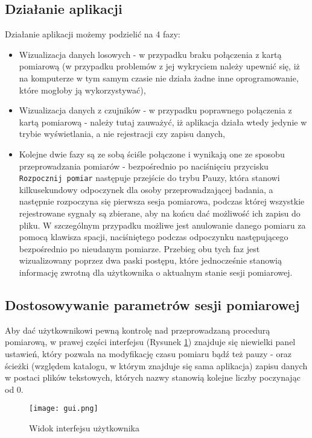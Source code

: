 \documentclass[10pt, a4paper]{article}
\begin{document}
\subsection{Działanie aplikacji}
Działanie aplikacji możemy podzielić na 4 fazy:
\begin{itemize}
\item Wizualizacja danych losowych - w przypadku braku połączenia z kartą pomiarową (w przypadku problemów z jej wykryciem należy upewnić się, iż na komputerze w tym samym czasie nie działa żadne inne oprogramowanie, które mogłoby ją wykorzystywać),
\item Wizualizacja danych z czujników - w przypadku poprawnego połączenia z kartą pomiarową - należy tutaj zauważyć, iż aplikacja działa wtedy jedynie w trybie wyświetlania, a nie rejestracji czy zapisu danych,
\item Kolejne dwie fazy są ze sobą ściśle połączone i wynikają one ze sposobu przeprowadzania pomiarów - bezpośrednio po naciśnięciu przycisku \texttt{Rozpocznij pomiar} następuje przejście do trybu Pauzy, która stanowi kilkusekundowy odpoczynek dla osoby przeprowadzającej badania, a następnie rozpoczyna się pierwsza sesja pomiarowa, podczas której wszystkie rejestrowane sygnały są zbierane, aby na końcu dać możliwość ich zapisu do pliku. W szczególnym przypadku możliwe jest anulowanie danego pomiaru za pomocą klawisza spacji, naciśniętego podczas odpoczynku następującego bezpośrednio po nieudanym pomiarze. Przebieg obu tych faz jest wizualizowany poprzez dwa paski postępu, które jednocześnie stanowią informację zwrotną dla użytkownika o aktualnym stanie sesji pomiarowej.
\end{itemize}

\subsection{Dostosowywanie parametrów sesji pomiarowej}

Aby dać użytkownikowi pewną kontrolę nad przeprowadzaną procedurą pomiarową, w prawej części interfejsu (Rysunek \ref{gui}) znajduje się niewielki panel ustawień, który pozwala na modyfikację czasu pomiaru bądź też pauzy - oraz ścieżki (względem katalogu, w którym znajduje się sama aplikacja) zapisu danych w postaci plików tekstowych, których nazwy stanowią kolejne liczby poczynając od 0.

\begin{figure}[H]
\texttt{[image: gui.png]}
\caption{Widok interfejsu użytkownika} \label{gui}
\end{figure}
\end{document}
